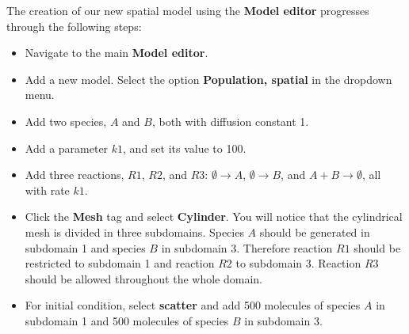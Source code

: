The creation of our new spatial model using the \textbf{Model editor} progresses through the following steps:
\begin{itemize}
\item Navigate to the main \textbf{Model editor}.
\item Add a new model. Select the option \textbf{Population, spatial} in the dropdown menu.
\item Add two species, $A$ and $B$, both with diffusion constant 1.
\item Add a parameter $k1$, and set its value to 100.
\item Add three reactions, $R1$, $R2$, and $R3$: $\emptyset\to A$, $\emptyset\to B$, and $A+B\to\emptyset$, all with rate $k1$.
 \item Click the \textbf{Mesh} tag and select \textbf{Cylinder}. You will notice that the cylindrical mesh is divided in three subdomains. Species $A$ should be generated in subdomain 1 and species $B$ in subdomain 3. Therefore reaction $R1$ should be restricted to subdomain 1 and reaction $R2$ to subdomain 3. Reaction $R3$ should be allowed throughout the whole domain.
 \item For initial condition, select \textbf{scatter} and add 500 molecules of species $A$ in subdomain 1 and 500 molecules of species $B$ in subdomain 3. 

\end{itemize}
